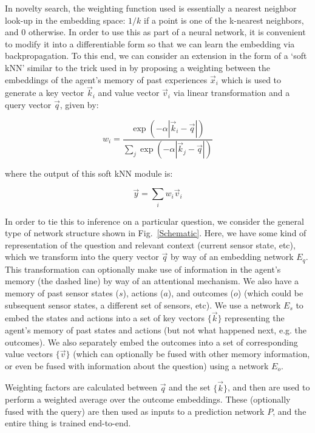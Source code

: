 \documentclass[letterpaper]{article}
\begin{document}
In novelty search, the weighting function used is essentially a nearest neighbor look-up in the embedding space: $1/k$ if a point is one of the k-nearest neighbors, and $0$ otherwise. In order to use this as part of a neural network, it is convenient to modify it into a differentiable form so that we can learn the embedding via backpropagation. To this end, we can consider an extension in the form of a `soft kNN' similar to the trick used in  \citep{pritzel2017neural, jain2018semiparametric} by proposing a weighting between the embeddings of the agent's memory of past experiences $\vec{x}_i$ which is used to generate a key vector $\vec{k}_i$ and value vector $\vec{v}_i$ via linear transformation and a query vector $\vec{q}$, given by:

\begin{equation}
w_i = \frac{\exp(-\alpha |\vec{k}_i - \vec{q}|)}{\sum_j \exp(-\alpha |\vec{k}_j - \vec{q}|) }
\end{equation}

where the output of this soft kNN module is:

\begin{equation}
\vec{y} = \sum_i w_i \vec{v}_i
\end{equation}

In order to tie this to inference on a particular question, we consider the general type of network structure shown in Fig.~\ref{Schematic}. Here, we have some kind of representation of the question and relevant context (current sensor state, etc), which we transform into the query vector $\vec{q}$ by way of an embedding network $E_q$. This transformation can optionally make use of information in the agent's memory (the dashed line) by way of an attentional mechanism. We also have a memory of past sensor states ($s$), actions ($a$), and outcomes ($o$) (which could be subsequent sensor states, a different set of sensors, etc). We use a network $E_s$ to embed the states and actions into a set of key vectors $\{\vec{k}\}$ representing the agent's memory of past states and actions (but not what happened next, e.g. the outcomes). We also separately embed the outcomes into a set of corresponding value vectors $\{\vec{v}\}$ (which can optionally be fused with other memory information, or even be fused with information about the question) using a network $E_o$. 

Weighting factors are calculated between $\vec{q}$ and the set $\{\vec{k}\}$, and then are used to perform a weighted average over the outcome embeddings. These (optionally fused with the query) are then used as inputs to a prediction network $P$, and the entire thing is trained end-to-end.
\end{document}
